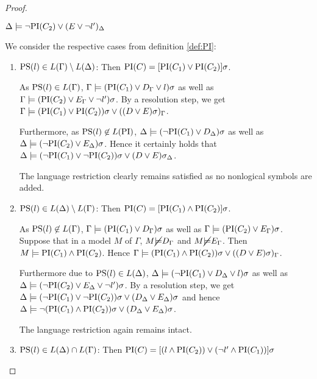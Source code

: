 \begin{proof}
\begin{itemize}
	$\Delta \models \lnot \mathrm{PI}(C_2) \lor (E\lor \lnot l')_\Delta$

		We consider the respective cases from definition \ref{def:PI}:

			\begin{enumerate}
				\item $\mathrm{PS}(l) \in L(\Gamma) \setminus L(\Delta)$:
					\label{huang_proof_prop_case_1}
					Then $\mathrm{PI}(C) = [\mathrm{PI}(C_1) \lor \mathrm{PI}(C_2)]\sigma$. 

					As $\mathrm{PS}(l) \in L(\Gamma)$,
					$\Gamma \models (\mathrm{PI}(C_1) \lor D_\Gamma\lor l)\sigma$
					as well as $\Gamma \models (\mathrm{PI}(C_2) \lor E_\Gamma\lor \lnot l')\sigma$.
					By a resolution step, we get $\Gamma \models (\mathrm{PI}(C_1) \lor \mathrm{PI}(C_2))\sigma \lor ((D \lor E)\sigma)_\Gamma$.

					Furthermore, as $\mathrm{PS}(l) \not\in L(\mathrm{PI})$, 
					$\Delta \models (\lnot\mathrm{PI}(C_1) \lor D_\Delta)\sigma$
					as well as $\Delta \models (\lnot\mathrm{PI}(C_2) \lor E_\Delta)\sigma$.
					Hence it certainly holds that $\Delta \models (\lnot \mathrm{PI}(C_1) \lor \lnot\mathrm{PI}(C_2))\sigma \lor (D \lor E)\sigma_\Delta$.

					The language restriction clearly remains satisfied as no nonlogical symbols are added.

				\item $\mathrm{PS}(l) \in L(\Delta) \setminus L(\Gamma)$: 
					\label{huang_proof_prop_case_2}
					Then $\mathrm{PI}(C) = [\mathrm{PI}(C_1) \land \mathrm{PI}(C_2)]\sigma$. 

					As $\mathrm{PS}(l) \not\in L(\Gamma)$,
					$\Gamma \models (\mathrm{PI}(C_1) \lor D_\Gamma)\sigma$
					as well as $\Gamma \models (\mathrm{PI}(C_2) \lor E_\Gamma)\sigma$.
					Suppose that in a model $M$ of $\Gamma$, $M \cancel {\models} D_\Gamma$ and $M \cancel {\models} E_\Gamma$. Then $M \models \mathrm{PI}(C_1) \land \mathrm{PI}(C_2)$.
					Hence 
					$\Gamma \models (\mathrm{PI}(C_1) \land \mathrm{PI}(C_2))\sigma \lor ((D \lor E)\sigma)_\Gamma$.

					Furthermore due to $\mathrm{PS}(l) \in L(\Delta)$,
					$\Delta \models (\lnot\mathrm{PI}(C_1) \lor D_\Delta \lor l)\sigma$
					as well as $\Delta \models (\lnot\mathrm{PI}(C_2) \lor E_\Delta \lor \lnot l')\sigma$.
					By a resolution step, we get $\Delta \models (\lnot\mathrm{PI}(C_1) \lor \lnot\mathrm{PI}(C_2))\sigma \lor (D_\Delta \lor E_\Delta)\sigma $
					and hence 
					$\Delta \models \lnot (\mathrm{PI}(C_1) \land \mathrm{PI}(C_2))\sigma \lor (D_\Delta \lor E_\Delta)\sigma $.

					The language restriction again remains intact.

				\item $\mathrm{PS}(l) \in L(\Delta) \cap L(\Gamma)$:
					Then $\mathrm{PI}(C) = [(l \land \mathrm{PI}(C_2)) \lor (\lnot l' \land \mathrm{PI}(C_1)) ]\sigma $


\end{enumerate}
\end{itemize}
\end{proof}
